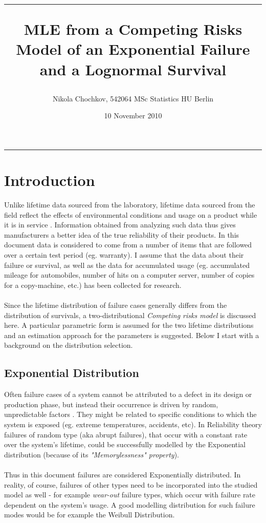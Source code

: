 \documentclass{article}
\title{\hrule \vspace{0.3cm}MLE from a Competing Risks Model of an Exponential Failure and a Lognormal Survival}
\date{10 November 2010}
\author{Nikola Chochkov, 542064 MSc Statistics HU Berlin}
\begin{document}
\maketitle
\hrule
\section{Introduction}
\indent \indent Unlike lifetime data sourced from the laboratory, lifetime data sourced from the field reflect the effects of environmental conditions and usage on a product while it is in service \cite{alam_suzuki} \cite{lawless}. Information obtained from analyzing such data thus gives manufacturers a better idea of the true reliability of their products. In this document data is considered to come from a number of items that are followed over a certain test period (eg. warranty). I assume that the data about their failure or survival, as well as the data for accumulated usage (eg. accumulated mileage for automobiles, number of hits on a computer server, number of copies for a copy-machine, etc.) has been collected for research. 
\\
\\
\indent Since the lifetime distribution of failure cases generally differs from the distribution of survivals, a two-distributional \textit{Competing risks model} is discussed here. A particular parametric form is assumed for the two lifetime distributions and an estimation approach for the parameters is suggested. Below I start with a background on the distribution selection. 
\subsection{Exponential Distribution}
\indent \indent Often failure cases of a system cannot be attributed to a defect in its design or production phase, but instead their occurrence is driven by random, unpredictable factors \cite{philips_sweeting}. They might be related to specific conditions to which the system is exposed (eg. extreme temperatures, accidents, etc). In Reliability theory failures of random type (aka abrupt failures), that occur with a constant rate over the system's lifetime, could be successfully modelled by the Exponential distribution (because of its \textit{"Memorylessness" property}). 
\\
\\
\indent Thus in this document failures are considered Exponentially distributed. In reality, of course, failures of other types need to be incorporated into the studied model as well - for example \textit{wear-out} failure types, which occur with failure rate dependent on the system's usage. A good modelling distribution for such failure modes would be for example the Weibull Distribution.  
\end{document}
